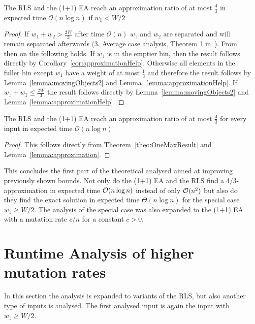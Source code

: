 \begin{lemma}\label{lemma:approximation}
    The RLS and the (1+1) EA reach an approximation ratio of at most $\frac{4}{3}$ in expected time $\mathcal{O}(n\log{}n)$ if $w_1 < W/2$
\end{lemma}
\begin{proof}
    If \(w_1+w_2 > \frac{2W}{3}\) after time $\mathcal{O}(n)$ $w_1$ and $w_2$ are separated and will remain separated afterwards (3. Average case analysis, Theorem 1 in~\cite{witt2005worst}).
    From then on the following holds.
    If $w_1$ is in the emptier bin, then the result follows directly by Corollary~\ref{cor:approximationHelp}.
    Otherwise all elements in the fuller bin except $w_1$ have a weight of at most $\frac{1}{3}$ and therefore the result follows by Lemma~\ref{lemma:movingObjects2} and Lemma~\ref{lemma:approximationHelp}.
    If \(w_1+w_2 \le \frac{2W}{3}\) the result follows directly by Lemma~\ref{lemma:movingObjects2} and Lemma~\ref{lemma:approximationHelp}.
\end{proof}

\begin{corollary}
    The RLS and the (1+1) EA reach an approximation ratio of at most $\frac{4}{3}$ for every input in expected time $\mathcal{O}(n\log{}n)$
\end{corollary}
\begin{proof}
    This follows directly from Theorem~\ref{theo:OneMaxResult} and Lemma~\ref{lemma:approximation}.
\end{proof}

This concludes the first part of the theoretical analysed aimed at improving previously shown bounds.
Not only do the (1+1) EA and the RLS find a 4/3-approximation in expected time $\mathcal{O}(n\log{n})$ instead of only $\mathcal{O}(n^2)$ but also do they find the exact solution in expected time $\Theta(n\log{n})$ for the special case $w_1\ge W/2$.
The analysis of the special case was also expanded to the (1+1) EA with a mutation rate $c/n$ for a constant $c>0$.

\section{Runtime Analysis of higher mutation rates}

In this section the analysis is expanded to variants of the RLS, but also another type of inputs is analysed.
The first analysed input is again the input with $w_1\ge W/2$.

